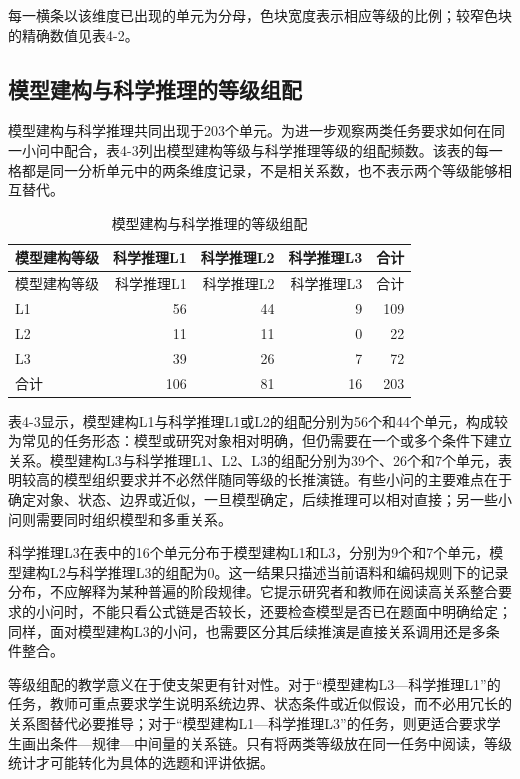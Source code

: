 \documentclass[
  12pt,
  a4paper]{ctexbook}
\begin{document}
每一横条以该维度已出现的单元为分母，色块宽度表示相应等级的比例；较窄色块的精确数值见表4-2。

\subsection{模型建构与科学推理的等级组配}\label{ux6a21ux578bux5efaux6784ux4e0eux79d1ux5b66ux63a8ux7406ux7684ux7b49ux7ea7ux7ec4ux914d}

模型建构与科学推理共同出现于203个单元。为进一步观察两类任务要求如何在同一小问中配合，表4-3列出模型建构等级与科学推理等级的组配频数。该表的每一格都是同一分析单元中的两条维度记录，不是相关系数，也不表示两个等级能够相互替代。

\begin{longtable}[]{@{}lrrrr@{}}
\caption{模型建构与科学推理的等级组配}\tabularnewline
\toprule\noalign{}
\rowcolor{ThesisPale}
模型建构等级 & 科学推理L1 & 科学推理L2 & 科学推理L3 & 合计 \\
\midrule\noalign{}
\endfirsthead
\toprule\noalign{}
\rowcolor{ThesisPale}
模型建构等级 & 科学推理L1 & 科学推理L2 & 科学推理L3 & 合计 \\
\midrule\noalign{}
\endhead
\bottomrule\noalign{}
\endlastfoot
L1 & 56 & 44 & 9 & 109 \\
L2 & 11 & 11 & 0 & 22 \\
L3 & 39 & 26 & 7 & 72 \\
合计 & 106 & 81 & 16 & 203 \\
\end{longtable}

表4-3显示，模型建构L1与科学推理L1或L2的组配分别为56个和44个单元，构成较为常见的任务形态：模型或研究对象相对明确，但仍需要在一个或多个条件下建立关系。模型建构L3与科学推理L1、L2、L3的组配分别为39个、26个和7个单元，表明较高的模型组织要求并不必然伴随同等级的长推演链。有些小问的主要难点在于确定对象、状态、边界或近似，一旦模型确定，后续推理可以相对直接；另一些小问则需要同时组织模型和多重关系。

科学推理L3在表中的16个单元分布于模型建构L1和L3，分别为9个和7个单元，模型建构L2与科学推理L3的组配为0。这一结果只描述当前语料和编码规则下的记录分布，不应解释为某种普遍的阶段规律。它提示研究者和教师在阅读高关系整合要求的小问时，不能只看公式链是否较长，还要检查模型是否已在题面中明确给定；同样，面对模型建构L3的小问，也需要区分其后续推演是直接关系调用还是多条件整合。

等级组配的教学意义在于使支架更有针对性。对于``模型建构L3---科学推理L1''的任务，教师可重点要求学生说明系统边界、状态条件或近似假设，而不必用冗长的关系图替代必要推导；对于``模型建构L1---科学推理L3''的任务，则更适合要求学生画出条件---规律---中间量的关系链。只有将两类等级放在同一任务中阅读，等级统计才可能转化为具体的选题和评讲依据。
\end{document}
